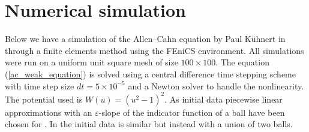 \section{Numerical simulation}

Below we have a simulation of the Allen--Cahn equation by Paul Kühnert in 
\cite{kuehner_simulation} through a finite elements method using the FEniCS 
environment. 
All simulations were run on a uniform unit square mesh of 
size $ 100 \times 100 $. The equation (\ref{ac_weak_equation}) is solved 
using a central difference time stepping scheme with time step size $ dt = 5 
\times 10^{ - 5 } $ and a Newton solver to handle the nonlinearity.
The potential used is $ W ( u ) = ( u^2 - 1 )^2 $. As initial data piecewise 
linear approximations with an $ \varepsilon $-slope of the indicator function 
of a ball have been chosen for . In 
 the initial data is similar but instead 
with a union of two balls.
